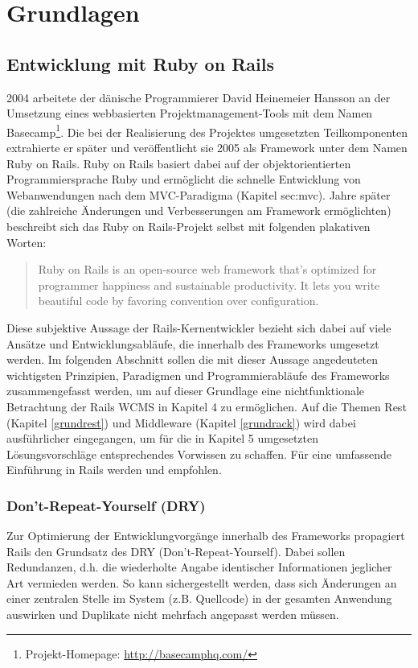 \chapter{Grundlagen}

\section{Entwicklung mit Ruby on Rails}

2004 arbeitete der dänische Programmierer David Heinemeier Hansson an der Umsetzung eines webbasierten Projektmanagement-Tools mit dem Namen Basecamp\footnote{Projekt-Homepage: \href{http://basecamphq.com/}{http://basecamphq.com/}}. Die bei der Realisierung des Projektes umgesetzten Teilkomponenten extrahierte er später und veröffentlicht sie 2005 als Framework unter dem Namen Ruby on Rails.
Ruby on Rails basiert dabei auf der objektorientierten Programmiersprache Ruby und ermöglicht die schnelle Entwicklung von Webanwendungen nach dem MVC-Paradigma (Kapitel sec:mvc).
 Jahre später (die zahlreiche Änderungen und Verbesserungen am Framework ermöglichten) beschreibt sich das Ruby on Rails-Projekt selbst mit folgenden plakativen Worten:
\begin{quote}
Ruby on Rails is an open-source web framework that’s
optimized for programmer happiness and sustainable
productivity. It lets you write beautiful code by
favoring convention over configuration. \cite[vgl.][]{RailsStatement}
\end{quote}

Diese subjektive Aussage der Rails-Kernentwickler bezieht sich dabei auf viele Ansätze und Entwicklungsabläufe, die innerhalb des Frameworks umgesetzt werden.
Im folgenden Abschnitt sollen die mit dieser Aussage angedeuteten wichtigsten Prinzipien, Paradigmen und Programmierabläufe des Frameworks zusammengefasst werden, um auf dieser Grundlage eine nichtfunktionale Betrachtung der Rails WCMS in Kapitel 4 zu ermöglichen. Auf die Themen Rest (Kapitel \ref{grundrest}) und Middleware (Kapitel \ref{grundrack}) wird dabei ausführlicher eingegangen, um für die in Kapitel 5 umgesetzten Lösungsvorschläge entsprechendes Vorwissen zu schaffen.
\newline
\newline
Für eine umfassende Einführung in Rails werden \cite{RubyMetaprogramming2010} und \cite{EnterpriseRails} empfohlen.

\subsection{Don't-Repeat-Yourself (DRY)}
Zur Optimierung der Entwicklungvorgänge innerhalb des Frameworks propagiert Rails den Grundsatz des DRY (Don't-Repeat-Yourself). Dabei sollen Redundanzen, d.h. die wiederholte Angabe identischer Informationen jeglicher Art vermieden werden. So kann sichergestellt werden, dass sich Änderungen an einer zentralen Stelle im System (z.B. Quellcode) in der gesamten Anwendung auswirken und Duplikate nicht mehrfach angepasst werden müssen.
